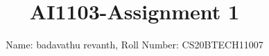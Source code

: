 \documentclass[journal,14pt,twocolumn]{IEEEtran}
\DeclareMathOperator*{\Res}{Res}
\begin{document}
\newcommand{\BEQA}{\begin{eqnarray}}
\newcommand{\EEQA}{\end{eqnarray}}
\newcommand{\define}{\stackrel{\triangle}{=}}

\raggedbottom
\setlength{\parindent}{0pt}
\providecommand{\mbf}{\mathbf}
\providecommand{\pr}[1]{\ensuremath{\Pr\left(#1\right)}}
\providecommand{\qfunc}[1]{\ensuremath{Q\left(#1\right)}}
\providecommand{\sbrak}[1]{\ensuremath{{}\left[#1\right]}}
\providecommand{\lsbrak}[1]{\ensuremath{{}\left[#1\right.}}
\providecommand{\rsbrak}[1]{\ensuremath{{}\left.#1\right]}}
\providecommand{\brak}[1]{\ensuremath{\left(#1\right)}}
\providecommand{\lbrak}[1]{\ensuremath{\left(#1\right.}}
\providecommand{\rbrak}[1]{\ensuremath{\left.#1\right)}}
\providecommand{\cbrak}[1]{\ensuremath{\left\{#1\right\}}}
\providecommand{\lcbrak}[1]{\ensuremath{\left\{#1\right.}}
\providecommand{\rcbrak}[1]{\ensuremath{\left.#1\right\}}}
\theoremstyle{remark}
\newtheorem{rem}{Remark}
\newcommand{\sgn}{\mathop{\mathrm{sgn}}}
\providecommand{\abs}[1]{\vert#1\vert}
\providecommand{\res}[1]{\Res\displaylimits_{#1}} 
\providecommand{\norm}[1]{\lVert#1\rVert}
\providecommand{\mtx}[1]{\mathbf{#1}}
\providecommand{\mean}[1]{E[ #1 ]}
\providecommand{\fourier}{\overset{\mathcal{F}}{ \rightleftharpoons}}
\providecommand{\system}{\overset{\mathcal{H}}{ \longleftrightarrow}}
\newcommand{\solution}{\noindent \textbf{Solution: }}
\newcommand{\cosec}{\,\text{cosec}\,}
\providecommand{\dec}[2]{\ensuremath{\overset{#1}{\underset{#2}{\gtrless}}}}
\newcommand{\myvec}[1]{\ensuremath{\begin{pmatrix}#1\end{pmatrix}}}
\newcommand{\mydet}[1]{\ensuremath{\begin{vmatrix}#1\end{vmatrix}}}
\makeatletter
{}
\makeatother
\let\StandardTheFigure\thefigure
\let\vec\mathbf
\renewcommand{\thefigure}{\theproblem}
\def\putbox#1#2#3{\makebox[0in][l]{\makebox[#1][l]{}\raisebox{\baselineskip}[0in][0in]{\raisebox{#2}[0in][0in]{#3}}}}
     \def\rightbox#1{\makebox[0in][r]{#1}}
     \def\centbox#1{\makebox[0in]{#1}}
     \def\topbox#1{\raisebox{-\baselineskip}[0in][0in]{#1}}
     \def\midbox#1{\raisebox{-0.5\baselineskip}[0in][0in]{#1}}
\vspace{3cm}
\title{AI1103-Assignment 1}
\author{Name: badavathu revanth, Roll Number: CS20BTECH11007}
\end{document}
